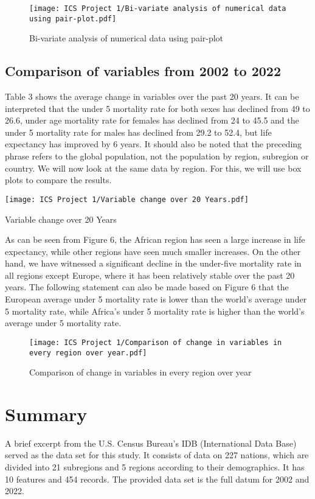 \documentclass[12 pt]{scrartcl}
\begin{document}
\begin{figure}[ht]
    \centering
    \texttt{[image: ICS Project 1/Bi-variate analysis of numerical data using pair-plot.pdf]}
    \caption{Bi-variate analysis of numerical data using pair-plot}
    \label{fig:my_label}
\end{figure}

\subsection{Comparison of variables from 2002 to 2022}
Table 3 shows the average change in variables over the past 20 years. It can be interpreted that the under 5 mortality rate for both sexes has declined from 49 to 26.6, under age mortality rate for females has declined from 24 to 45.5 and the under 5 mortality rate for males has declined from 29.2 to 52.4, but life expectancy has improved by 6 years. It should also be noted that the preceding phrase refers to the global population, not the population by region, subregion or country. We will now look at the same data by region. For this, we will use box plots to compare the results.


\begin{table}[ht]
    \centering
    \texttt{[image: ICS Project 1/Variable change over 20 Years.pdf]}
    \caption{Variable change over 20 Years}
    \label{tab:my_label}
\end{table}


As can be seen from Figure 6, the African region has seen a large increase in life expectancy, while other regions have seen much smaller increases. On the other hand, we have witnessed a significant decline in the under-five mortality rate in all regions except Europe, where it has been relatively stable over the past 20 years. The following statement can also be made based on Figure 6 that the European average under 5 mortality rate is lower than the world’s average under 5 mortality rate, while Africa’s under 5 mortality rate is higher than the world’s average under 5 mortality rate.

\begin{figure}[ht]
    \centering
    \texttt{[image: ICS Project 1/Comparison of change in variables in every region over year.pdf]}
    \caption{Comparison of change in variables in every region over year}
    \label{fig:my_label}
\end{figure}

\newpage\section{Summary}
A brief excerpt from the U.S. Census Bureau's IDB (International Data Base) served as the data set for this study. It consists of data on 227 nations, which are divided into 21 subregions and 5 regions according to their demographics. It has 10 features and 454 records. The provided data set is the full datum for 2002 and 2022.
\end{document}
